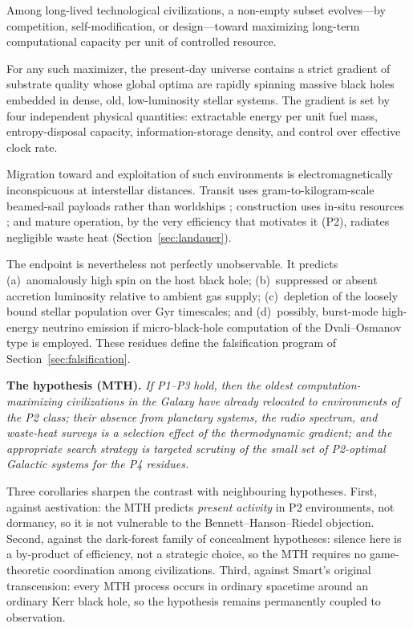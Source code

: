 \documentclass[11pt]{article}
\begin{document}
\begin{description}[leftmargin=0pt]
\item[P1 (Optimization pressure).] Among long-lived technological civilizations, a non-empty subset evolves---by competition, self-modification, or design---toward maximizing long-term computational capacity per unit of controlled resource.
\item[P2 (Thermodynamic gradient).] For any such maximizer, the present-day universe contains a strict gradient of substrate quality whose global optima are rapidly spinning massive black holes embedded in dense, old, low-luminosity stellar systems. The gradient is set by four independent physical quantities: extractable energy per unit fuel mass, entropy-disposal capacity, information-storage density, and control over effective clock rate.
\item[P3 (Quiet migration).] Migration toward and exploitation of such environments is electromagnetically inconspicuous at interstellar distances. Transit uses gram-to-kilogram-scale beamed-sail payloads rather than worldships \citep{lubin2016}; construction uses in-situ resources \citep{freitas1982}; and mature operation, by the very efficiency that motivates it (P2), radiates negligible waste heat (Section~\ref{sec:landauer}).
\item[P4 (Observable residue).] The endpoint is nevertheless not perfectly unobservable. It predicts (a)~anomalously high spin on the host black hole; (b)~suppressed or absent accretion luminosity relative to ambient gas supply; (c)~depletion of the loosely bound stellar population over Gyr timescales; and (d)~possibly, burst-mode high-energy neutrino emission if micro-black-hole computation of the Dvali--Osmanov type is employed. These residues define the falsification program of Section~\ref{sec:falsification}.
\end{description}

\noindent\textbf{The hypothesis (MTH).} \emph{If P1--P3 hold, then the oldest computation-maximizing civilizations in the Galaxy have already relocated to environments of the P2 class; their absence from planetary systems, the radio spectrum, and waste-heat surveys is a selection effect of the thermodynamic gradient; and the appropriate search strategy is targeted scrutiny of the small set of P2-optimal Galactic systems for the P4 residues.}

Three corollaries sharpen the contrast with neighbouring hypotheses. First, against aestivation: the MTH predicts \emph{present activity} in P2 environments, not dormancy, so it is not vulnerable to the Bennett--Hanson--Riedel objection. Second, against the dark-forest family of concealment hypotheses: silence here is a by-product of efficiency, not a strategic choice, so the MTH requires no game-theoretic coordination among civilizations. Third, against Smart's original transcension: every MTH process occurs in ordinary spacetime around an ordinary Kerr black hole, so the hypothesis remains permanently coupled to observation.
\end{document}
